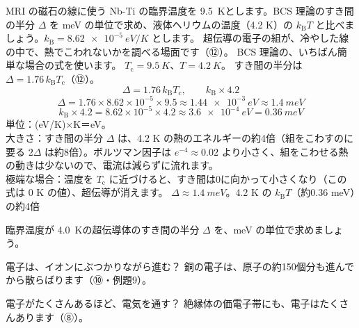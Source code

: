 \label{ph:原-8:ex12}
\begin{phreidai}
MRI の磁石の線に使う Nb-Ti の臨界温度を \qty{9.5}{K}とします。BCS 理論のすき間の半分 $\Delta$ を meV の単位で求め、液体ヘリウムの温度（4.2 K）の $k_{\mathrm B}T$ と比べましょう。$k_{\mathrm B}=\qty{8.62e-5}{eV/K}$ とします。
\phbamen
超伝導の電子の組が、冷やした線の中で、熱でこわれないかを調べる場面です（⑫）。
\phmushi
BCS 理論の、いちばん簡単な場合の式を使います。
\phzu
$T_{\mathrm c}=\qty{9.5}{K}$、$T=\qty{4.2}{K}$。
\phriyu
すき間の半分は $\Delta=1.76\,k_{\mathrm B}T_{\mathrm c}$（⑫）。
\phtateru
\[ \Delta=1.76\,k_{\mathrm B}T_{\mathrm c},\qquad k_{\mathrm B}\times4.2 \]
\phtoku
\[ \Delta=1.76\times8.62\times10^{-5}\times9.5\approx\qty{1.44e-3}{eV}\approx\qty{1.4}{meV} \]
\[ k_{\mathrm B}\times4.2=8.62\times10^{-5}\times4.2\approx\qty{3.6e-4}{eV}=\qty{0.36}{meV} \]
\phtashikame
単位：(eV/K)×K＝eV。\\
大きさ：すき間の半分 $\Delta$ は、4.2 K の熱のエネルギーの約4倍（組をこわすのに要る $2\Delta$ は約8倍）。ボルツマン因子は $e^{-4}\approx0.02$ より小さく、組をこわせる熱の動きは少ないので、電流は減らずに流れます。\\
極端な場合：温度を $T_{\mathrm c}$ に近づけると、すき間は0に向かって小さくなり（この式は 0 K の値）、超伝導が消えます。
\kotae $\Delta\approx\qty{1.4}{meV}$。4.2 K の $k_{\mathrm B}T$（約0.36 meV）の約4倍
\end{phreidai}
\begin{jibun}
臨界温度が \qty{4.0}{K}の超伝導体のすき間の半分 $\Delta$ を、meV の単位で求めましょう。
\end{jibun}

\begin{tsumazuki}{電子は、イオンにぶつかりながら進む？}
銅の電子は、原子の約150個分も進んでから散らばります（⑩・例題9）。
\end{tsumazuki}

\begin{tsumazuki}{電子がたくさんあるほど、電気を通す？}
絶縁体の価電子帯にも、電子はたくさんあります（⑧）。
\end{tsumazuki}

